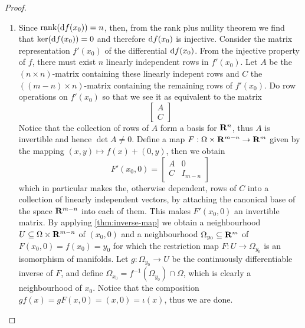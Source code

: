 \begin{proof}
\begin{enumerate}\setlength\itemsep{0em}
  \item Since \(\operatorname{rank}(\mathrm{d} f(x_0)) = n\), then, from the rank plus nullity
    theorem we find that \(\ker (\mathrm{d} f(x_0)) = 0\) and therefore \(\mathrm{d}
    f(x_{0})\) is injective. Consider the matrix representation \(f'(x_0)\)
    of the differential \(\mathrm{d} f(x_0)\). From the injective property of
    \(f\), there must exist \(n\) linearly independent rows in
    \(f'(x_0)\). Let \(A\) be the \((n \times n)\)-matrix containing these linearly
    indepent rows and \(C\) the \(((m - n) \times n)\)-matrix containing the
    remaining rows of \(f'(x_0)\). Do row operations on \(f'(x_0)\) so that we
    see it as equivalent to the matrix
    \[
      \begin{bmatrix}
        A \\ C
      \end{bmatrix}
    \]
    Notice that the collection of rows of \(A\) form a basis for \(\mathbf{R}^n\),
    thus \(A\) is invertible and hence \(\det A \neq 0\). Define a map \(F: \Omega \times
    \mathbf{R}^{m-n} \to \mathbf{R}^m\) given by the mapping \((x, y) \mapsto f(x) + (0, y)\), then we
    obtain
    \[
      F'(x_0, 0) =
      \begin{bmatrix}
        A &0 \\ C &I_{m - n}
      \end{bmatrix}
    \]
    which in particular makes the, otherwise dependent, rows of \(C\) into a
    collection of linearly independent vectors, by attaching the canonical
    base of the space \(\mathbf{R}^{m-n}\) into each of them. This makes \(F'(x_0,
    0)\) an invertible matrix. By applying \cref{thm:inverse-map} we obtain a
    neighbourhood \(U \subseteq \Omega \times \mathbf{R}^{m-n}\) of \((x_0, 0)\) and a neighbourhood
    \(\Omega_{y_0} \subseteq \mathbf{R}^m\) of \(F(x_0, 0) = f(x_{0}) = y_0\) for which the
    restriction map \(F: U \to \Omega_{y_0}\) is an isomorphism of manifolds. Let \(g:
    \Omega_{y_0} \to U\) be the continuously differentiable inverse of \(F\), and
    define \(\Omega_{x_0} = f^{-1}(\Omega_{y_0}) \cap \Omega\), which is clearly a neighbourhood
    of \(x_0\). Notice that the composition \(g f(x) = g F (x, 0) = (x, 0) =
    \iota(x)\), thus we are done.


\end{enumerate}
\end{proof}
